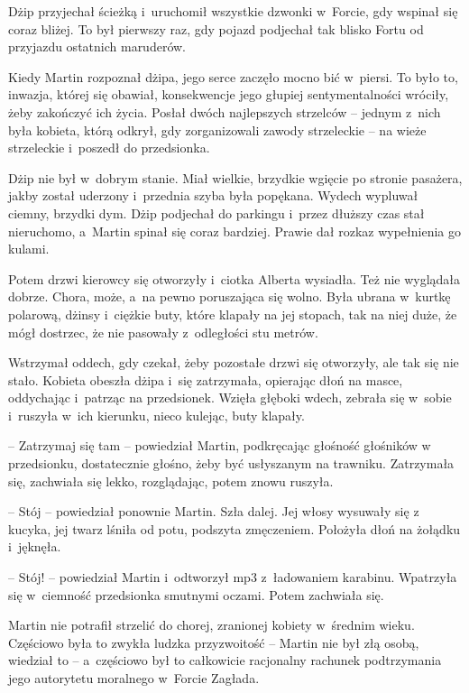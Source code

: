 \documentclass[oneside,polish,11pt,sfheadings]{mwbk}
\begin{document}
Dżip przyjechał ścieżką i~uruchomił wszystkie dzwonki w~Forcie, gdy
wspinał się coraz bliżej. To był pierwszy raz, gdy pojazd podjechał tak
blisko Fortu od przyjazdu ostatnich maruderów.

Kiedy Martin rozpoznał dżipa, jego serce zaczęło mocno bić w~piersi. To
było to, inwazja, której się obawiał, konsekwencje jego głupiej
sentymentalności wróciły, żeby zakończyć ich życia. Posłał dwóch
najlepszych strzelców -- jednym z~nich była kobieta, którą odkrył, gdy
zorganizowali zawody strzeleckie -- na wieże strzeleckie i~poszedł do
przedsionka.

Dżip nie był w~dobrym stanie. Miał wielkie, brzydkie wgięcie po stronie
pasażera, jakby został uderzony i~przednia szyba była popękana. Wydech
wypluwał ciemny, brzydki dym. Dżip podjechał do parkingu i~przez dłuższy
czas stał nieruchomo, a~Martin spinał się coraz bardziej. Prawie dał
rozkaz wypełnienia go kulami.

Potem drzwi kierowcy się otworzyły i~ciotka Alberta wysiadła. Też nie
wyglądała dobrze. Chora, może, a~na pewno poruszająca się wolno. Była
ubrana w~kurtkę polarową, dżinsy i~ciężkie buty, które klapały na jej
stopach, tak na niej duże, że mógł dostrzec, że nie pasowały z~odległości stu metrów.

Wstrzymał oddech, gdy czekał, żeby pozostałe drzwi się otworzyły, ale
tak się nie stało. Kobieta obeszła dżipa i~się zatrzymała, opierając
dłoń na masce, oddychając i~patrząc na przedsionek. Wzięła głęboki
wdech, zebrała się w~sobie i~ruszyła w~ich kierunku, nieco kulejąc, buty
klapały.

-- Zatrzymaj się tam -- powiedział Martin, podkręcając głośność głośników
w przedsionku, dostatecznie głośno, żeby być usłyszanym na trawniku.
Zatrzymała się, zachwiała się lekko, rozglądając, potem znowu ruszyła.

-- Stój -- powiedział ponownie Martin. Szła dalej. Jej włosy wysuwały się
z kucyka, jej twarz lśniła od potu, podszyta zmęczeniem. Położyła dłoń
na żołądku i~jęknęła.

-- Stój! -- powiedział Martin i~odtworzył mp3 z~ładowaniem karabinu.
Wpatrzyła się w~ciemność przedsionka smutnymi oczami. Potem zachwiała
się.

Martin nie potrafił strzelić do chorej, zranionej kobiety w~średnim
wieku. Częściowo była to zwykła ludzka przyzwoitość -- Martin nie był złą
osobą, wiedział to -- a~częściowo był to całkowicie racjonalny rachunek
podtrzymania jego autorytetu moralnego w~Forcie Zagłada.
\end{document}
